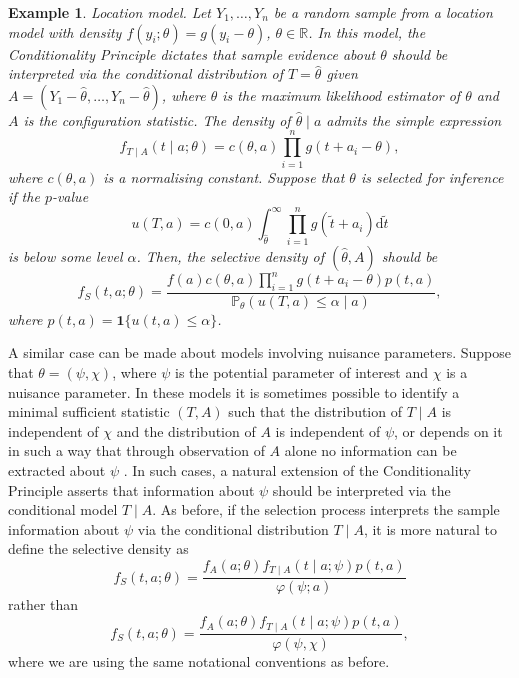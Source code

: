 \documentclass[pdflatex,sn-chicago]{sn-jnl}%
\theoremstyle{thmstyleone}%
\theoremstyle{thmstyletwo}%
\newtheorem{example}{Example}%
\theoremstyle{thmstylethree}%
\begin{document}
\begin{example}
\textit{Location model}. Let $Y_1, \ldots, Y_n$ be a random sample from a location model with density $f(y_i; \theta) = g(y_i - \theta)$, $\theta\in \mathbb{R}$. In this model, the Conditionality Principle dictates that sample evidence about $\theta$ should be interpreted via the conditional distribution of $T = \hat\theta$ given $A = (Y_1 - \hat\theta, \ldots, Y_{n} - \hat{\theta})$, where $\hat{\theta}$ is the maximum likelihood estimator of $\theta$ and $A$ is the configuration statistic. The density of $\hat{\theta}\mid a$ admits the simple expression
\begin{equation*}
f_{T\mid A}(t\mid a; \theta) = c(\theta, a)\prod_{i = 1}^n g(t + a_i - \theta),
\end{equation*}
where $c(\theta, a)$ is a normalising constant. Suppose that $\theta$ is selected for inference if the $p$-value
\begin{equation*}
u(T, a) = c(0, a)\int_{\hat\theta}^\infty \prod_{i = 1}^n g(\tilde t + a_i) \mathrm{d}\tilde t
\end{equation*}
is below some level $\alpha$. Then, the selective density of $(\hat{\theta}, A)$ should be
\begin{equation*}
f_S(t, a; \theta) = \frac{f(a)c(\theta, a)\prod_{i = 1}^n g(t + a_i - \theta) p(t, a)}{\mathbb{P}_\theta(u(T, a) \leq \alpha\mid a)},
\end{equation*}
where $p(t, a) = \mathbf{1}\{ u(t, a)\leq \alpha \}$.
\end{example}

A similar case can be made about models involving nuisance parameters. Suppose that $\theta = (\psi, \chi)$, where $\psi$ is the potential parameter of interest and $\chi$ is a nuisance parameter. In these models it is sometimes possible to identify a minimal sufficient statistic $(T, A)$ such that the distribution of $T\mid A$ is independent of $\chi$ and the distribution of $A$ is independent of $\psi$, or depends on it in such a way that through observation of $A$ alone no information can be extracted about $\psi$ \citep[Chapter 2]{bncox}. In such cases, a natural extension of the Conditionality Principle asserts that information about $\psi$ should be interpreted via the conditional model $T\mid A$. As before, if the selection process interprets the sample information about $\psi$ via the conditional distribution $T\mid A$, it is more natural to define the selective density as 
\begin{equation*}
f_S(t, a; \theta) = \frac{f_A(a;\theta) f_{T\mid A}(t\mid a; \psi) p(t, a)}{\varphi(\psi; a)}
\end{equation*}
rather than
\begin{equation*}
f_S(t, a; \theta) = \frac{f_A(a;\theta) f_{T\mid A}(t\mid a; \psi) p(t, a)}{\varphi(\psi, \chi)},
\end{equation*}
where we are using the same notational conventions as before.
\end{document}
